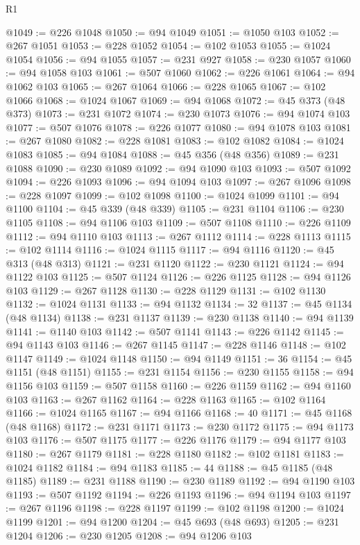 \begin{lexlean}{R1}
\begin{coremodule}
@1049 := @226 @1048
@1050 := @94 @1049
@1051 := @1050 @103
@1052 := @267 @1051
@1053 := @228 @1052
@1054 := @102 @1053
@1055 := @1024 @1054
@1056 := @94 @1055
@1057 := @231 @927
@1058 := @230 @1057
@1060 := @94 @1058 @103
@1061 := @507 @1060
@1062 := @226 @1061
@1064 := @94 @1062 @103
@1065 := @267 @1064
@1066 := @228 @1065
@1067 := @102 @1066
@1068 := @1024 @1067
@1069 := @94 @1068
@1072 := @45 @373 (@48 @373)
@1073 := @231 @1072
@1074 := @230 @1073
@1076 := @94 @1074 @103
@1077 := @507 @1076
@1078 := @226 @1077
@1080 := @94 @1078 @103
@1081 := @267 @1080
@1082 := @228 @1081
@1083 := @102 @1082
@1084 := @1024 @1083
@1085 := @94 @1084
@1088 := @45 @356 (@48 @356)
@1089 := @231 @1088
@1090 := @230 @1089
@1092 := @94 @1090 @103
@1093 := @507 @1092
@1094 := @226 @1093
@1096 := @94 @1094 @103
@1097 := @267 @1096
@1098 := @228 @1097
@1099 := @102 @1098
@1100 := @1024 @1099
@1101 := @94 @1100
@1104 := @45 @339 (@48 @339)
@1105 := @231 @1104
@1106 := @230 @1105
@1108 := @94 @1106 @103
@1109 := @507 @1108
@1110 := @226 @1109
@1112 := @94 @1110 @103
@1113 := @267 @1112
@1114 := @228 @1113
@1115 := @102 @1114
@1116 := @1024 @1115
@1117 := @94 @1116
@1120 := @45 @313 (@48 @313)
@1121 := @231 @1120
@1122 := @230 @1121
@1124 := @94 @1122 @103
@1125 := @507 @1124
@1126 := @226 @1125
@1128 := @94 @1126 @103
@1129 := @267 @1128
@1130 := @228 @1129
@1131 := @102 @1130
@1132 := @1024 @1131
@1133 := @94 @1132
@1134 := 32
@1137 := @45 @1134 (@48 @1134)
@1138 := @231 @1137
@1139 := @230 @1138
@1140 := @94 @1139
@1141 := @1140 @103
@1142 := @507 @1141
@1143 := @226 @1142
@1145 := @94 @1143 @103
@1146 := @267 @1145
@1147 := @228 @1146
@1148 := @102 @1147
@1149 := @1024 @1148
@1150 := @94 @1149
@1151 := 36
@1154 := @45 @1151 (@48 @1151)
@1155 := @231 @1154
@1156 := @230 @1155
@1158 := @94 @1156 @103
@1159 := @507 @1158
@1160 := @226 @1159
@1162 := @94 @1160 @103
@1163 := @267 @1162
@1164 := @228 @1163
@1165 := @102 @1164
@1166 := @1024 @1165
@1167 := @94 @1166
@1168 := 40
@1171 := @45 @1168 (@48 @1168)
@1172 := @231 @1171
@1173 := @230 @1172
@1175 := @94 @1173 @103
@1176 := @507 @1175
@1177 := @226 @1176
@1179 := @94 @1177 @103
@1180 := @267 @1179
@1181 := @228 @1180
@1182 := @102 @1181
@1183 := @1024 @1182
@1184 := @94 @1183
@1185 := 44
@1188 := @45 @1185 (@48 @1185)
@1189 := @231 @1188
@1190 := @230 @1189
@1192 := @94 @1190 @103
@1193 := @507 @1192
@1194 := @226 @1193
@1196 := @94 @1194 @103
@1197 := @267 @1196
@1198 := @228 @1197
@1199 := @102 @1198
@1200 := @1024 @1199
@1201 := @94 @1200
@1204 := @45 @693 (@48 @693)
@1205 := @231 @1204
@1206 := @230 @1205
@1208 := @94 @1206 @103

\end{coremodule}
\end{lexlean}
